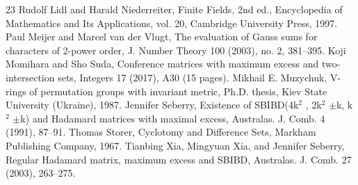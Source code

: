 \documentclass[10pt]{amsart}
\theoremstyle{definition}
\begin{document}
\begin{thebibliography}{23}
 Rudolf Lidl and Harald Niederreiter, Finite Fields, 2nd ed., Encyclopedia of Mathematics and Its Applications, vol. 20, Cambridge University Press, 1997.
 Paul Meijer and Marcel van der Vlugt, The evaluation of Gauss sums for characters of 2-power order, J. Number Theory 100 (2003), no. 2, 381–395.
 Koji Momihara and Sho Suda, Conference matrices with maximum excess and two-intersection sets, Integers 17 (2017), A30 (15 pages).
 Mikhail E. Muzychuk, V-rings of permutation groups with invariant metric, Ph.D. thesis, Kiev State University (Ukraine), 1987.
 Jennifer Seberry, Existence of SBIBD(4k$^2$ , 2k$^2$ $\pm$k, k$^2$ $\pm$k) and Hadamard matrices with maximal excess, Australas. J. Comb. 4 (1991), 87–91.
 Thomas Storer, Cyclotomy and Difference Sets, Markham Publishing Company, 1967.
 Tianbing Xia, Mingyuan Xia, and Jennifer Seberry, Regular Hadamard matrix, maximum excess and SBIBD, Australas. J. Comb. 27 (2003), 263–275.
\end{thebibliography}
\end{document}
